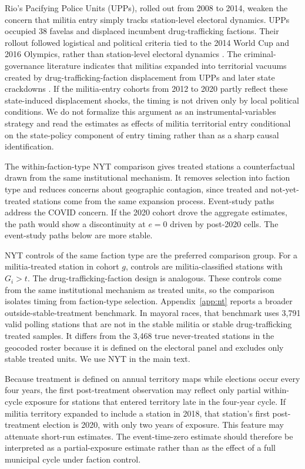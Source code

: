 \documentclass[11pt]{article}
\begin{document}
Rio's Pacifying Police Units (UPPs), rolled out from 2008 to 2014, weaken the concern that militia entry simply tracks station-level electoral dynamics. UPPs occupied 38 favelas and displaced incumbent drug-trafficking factions. Their rollout followed logistical and political criteria tied to the 2014 World Cup and 2016 Olympics, rather than station-level electoral dynamics \citep{ferraz2023upp, magaloni2020killing}. The criminal-governance literature indicates that militias expanded into territorial vacuums created by drug-trafficking-faction displacement from UPPs and later state crackdowns \citep{pantaleao2025elections, monteiro2023enterprises}. If the militia-entry cohorts from 2012 to 2020 partly reflect these state-induced displacement shocks, the timing is not driven only by local political conditions. We do not formalize this argument as an instrumental-variables strategy and read the estimates as effects of militia territorial entry conditional on the state-policy component of entry timing rather than as a sharp causal identification.

The within-faction-type NYT comparison gives treated stations a counterfactual drawn from the same institutional mechanism. It removes selection into faction type and reduces concerns about geographic contagion, since treated and not-yet-treated stations come from the same expansion process. Event-study paths address the COVID concern. If the 2020 cohort drove the aggregate estimates, the path would show a discontinuity at $e=0$ driven by post-2020 cells. The event-study paths below are more stable.

NYT controls of the same faction type are the preferred comparison group. For a militia-treated station in cohort $g$, controls are militia-classified stations with $G_i > t$. The drug-trafficking-faction design is analogous. These controls come from the same institutional mechanism as treated units, so the comparison isolates timing from faction-type selection. Appendix~\ref{app:nt} reports a broader outside-stable-treatment benchmark. In mayoral races, that benchmark uses 3,791 valid polling stations that are not in the stable militia or stable drug-trafficking treated samples. It differs from the 3,468 true never-treated stations in the geocoded roster because it is defined on the electoral panel and excludes only stable treated units. We use NYT in the main text.

Because treatment is defined on annual territory maps while elections occur every four years, the first post-treatment observation may reflect only partial within-cycle exposure for stations that entered territory late in the four-year cycle. If militia territory expanded to include a station in 2018, that station's first post-treatment election is 2020, with only two years of exposure. This feature may attenuate short-run estimates. The event-time-zero estimate should therefore be interpreted as a partial-exposure estimate rather than as the effect of a full municipal cycle under faction control.
\end{document}
